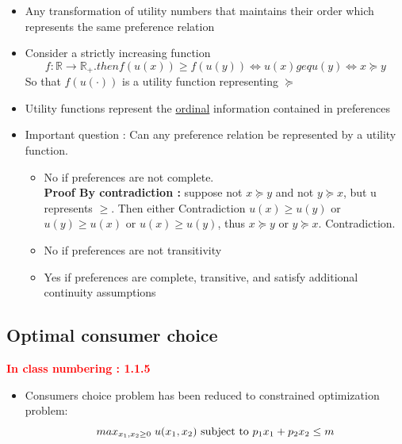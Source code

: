 \documentclass[twoside]{article}
\begin{document}
\begin{itemize}
\item Any transformation of utility numbers that maintains their order which represents the same preference relation
\item Consider a strictly increasing function \[f : \mathbb{R} \rightarrow \mathbb{R}_+. then f(u(x)) \geq f(u(y)) \iff u(x) geq u(y) \iff x \succeq y \]
So that \(f(u(\cdot))\) is a utility function representing \(\succeq\)
\item Utility functions represent the \underline{ordinal} information contained in preferences
\item Important question : Can any preference relation be represented by a utility function. 
\begin{itemize}
\item No if preferences are not complete. \\
\textbf{Proof By contradiction : } suppose not \(x \succeq y \) and not \(y \succeq x\), but u represents \(\geq\). Then either  Contradiction \(u(x) \geq u(y)\) or \(u(y) \geq u(x)\) or \(u(x) \geq u(y)\), thus \(x \succeq y\) or \(y \succeq x\). Contradiction.
\item No if preferences are not transitivity
\item Yes if preferences are complete, transitive, and satisfy additional continuity assumptions 
\end{itemize}
\end{itemize}

\subsection{Optimal consumer choice}
\textbf{\textcolor{red}{In class numbering : 1.1.5}}
\begin{itemize}
\item Consumers choice problem has been reduced to constrained optimization problem: 
\[max_{x_1, x_2 \geq 0} \hspace{0.1cm} u(x_1, x_2)  \text{ subject to } p_1 x_1 +  p_2 x_2 \leq m \]
\end{itemize}
\end{document}
